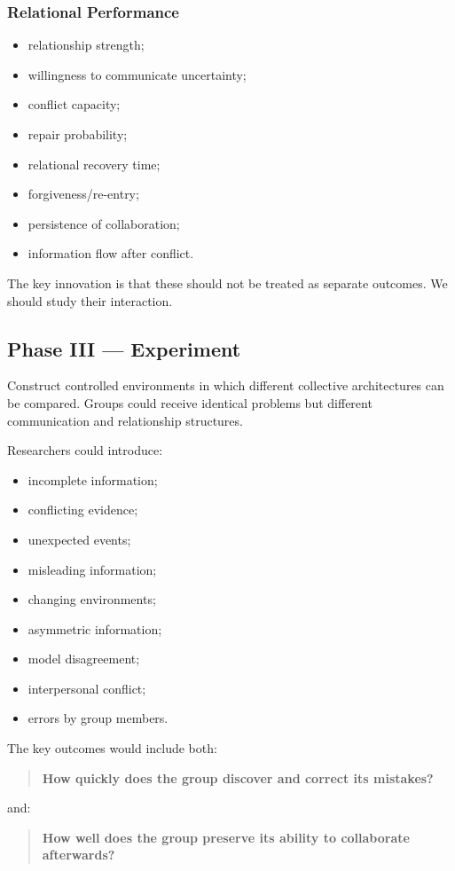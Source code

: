 \documentclass{article}
\begin{document}
\subsubsection{Relational Performance}
\begin{itemize}
    \item relationship strength;
    \item willingness to communicate uncertainty;
    \item conflict capacity;
    \item repair probability;
    \item relational recovery time;
    \item forgiveness/re-entry;
    \item persistence of collaboration;
    \item information flow after conflict.
\end{itemize}

The key innovation is that these should not be treated as separate outcomes. We should study their interaction.

\subsection{Phase III — Experiment}
Construct controlled environments in which different collective architectures can be compared. Groups could receive identical problems but different communication and relationship structures.

Researchers could introduce:
\begin{itemize}
    \item incomplete information;
    \item conflicting evidence;
    \item unexpected events;
    \item misleading information;
    \item changing environments;
    \item asymmetric information;
    \item model disagreement;
    \item interpersonal conflict;
    \item errors by group members.
\end{itemize}

The key outcomes would include both:
\begin{quote}
    \textbf{How quickly does the group discover and correct its mistakes?}
\end{quote}
and:
\begin{quote}
    \textbf{How well does the group preserve its ability to collaborate afterwards?}
\end{quote}
\end{document}
